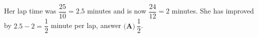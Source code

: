 Her lap time was $\dfrac{25}{10}=2.5$ minutes and is now $\dfrac{24}{12}=2$ minutes. She has improved by $2.5-2=\dfrac{1}{2}$ minute per lap, answer $\boxed{\textbf{(A)}\ \dfrac{1}{2}}$.

